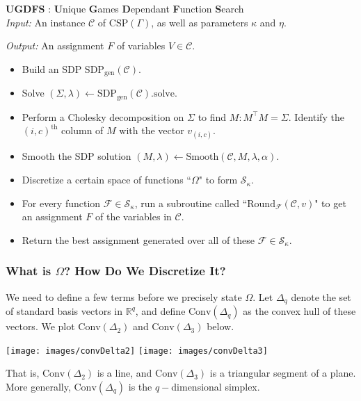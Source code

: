 \begin{algorithm} \textbf{UGDFS} : \textbf{U}nique \textbf{G}ames \textbf{D}ependant \textbf{F}unction \textbf{S}earch \\

\textit{Input: } An instance $\mathcal{C}$ of $\text{CSP}(\Gamma)$, as well as parameters $\kappa$ and $\eta$.

\textit{Output: } An assignment $F$ of variables $V \in \mathcal{C}$.
\begin{itemize}
\item Build an SDP $\text{SDP}_{\text{gen}}(\mathcal{C})$.
\item Solve $(\Sigma,\lambda) \leftarrow \text{SDP}_{\text{gen}}(\mathcal{C}).\text{solve}$.
\item Perform a Cholesky decomposition on $\Sigma$ to find $M : M^\intercal M = \Sigma$. Identify the $(i,c)^{\text{th}}$ column of $M$ with the vector $v_{(i,c)}$.
\item Smooth the SDP solution $(M,\lambda) \leftarrow \text{Smooth}(\mathcal{C},M,\lambda, \alpha)$.
\item Discretize a certain space of functions ``$\Omega$" to form $\mathcal{S}_{\kappa}$.
\item For every function $\mathcal{F} \in \mathcal{S}_{\kappa}$, run a subroutine called ``$\text{Round}_{\mathcal{F}}(\mathcal{C},v)$" to get an assignment $F$ of the variables in $\mathcal{C}$. 
\item Return the best assignment generated over all of these $\mathcal{F} \in \mathcal{S}_{\kappa}$.
\end{itemize}
\end{algorithm}

\subsubsection{What is $\Omega$? How Do We Discretize It?}\label{subsubsec:UGDFS_discretize}
We need to define a few terms before we precisely state $\Omega$. Let $\Delta_q$ denote the set of standard basis vectors in $\mathbb{R}^q$, and define $\text{Conv}(\Delta_q)$ as the convex hull of these vectors. We plot $\text{Conv}(\Delta_2)$ and $\text{Conv}(\Delta_3)$ below.

\begin{center}
\texttt{[image: images/convDelta2]} \qquad
\texttt{[image: images/convDelta3]}
\end{center}

That is, $\text{Conv}(\Delta_2)$ is a line, and $\text{Conv}(\Delta_3)$ is a triangular segment of a plane. More generally, $\text{Conv}(\Delta_q)$ is the $q-$dimensional simplex.


